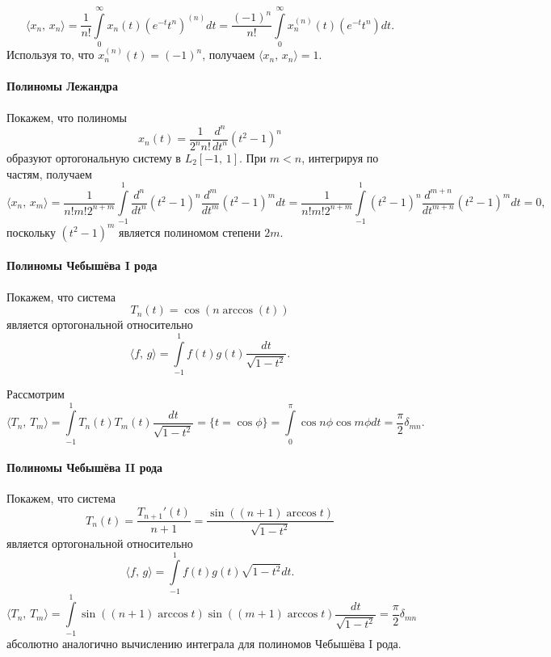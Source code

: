 \documentclass[16pt]{article}
\newcommand\Scal[2]{\langle #1,\, #2 \rangle}
\newcommand\Int[2]{\int\limits_{#1}^{#2}}
\begin{document}
$$\Scal{x_n}{x_n} = \frac{1}{n!}\Int{0}{\infty}x_n(t)(e^{-t}t^n)^{(n)}dt = \frac{(-1)^n}{n!}\Int{0}{\infty}x_n^{(n)}(t)(e^{-t}t^n)dt.$$
Используя то, что $x_n^{(n)}(t) = (-1)^n$, получаем $\Scal{x_n}{x_n} = 1$.

\paragraph{Полиномы Лежандра}
Покажем, что полиномы 
$$x_n(t) = \frac{1}{2^n n!}\frac{d^n}{dt^n}(t^2-1)^n$$
образуют ортогональную систему в $L_2[-1,\,1]$.
При $m < n$, интегрируя по частям, получаем 
$$\Scal{x_n}{x_m} = \frac{1}{n! m! 2^{n+m}}\Int{-1}{1}\frac{d^n}{dt^n}(t^2-1)^n\frac{d^m}{dt^m}(t^2-1)^mdt = 
\frac{1}{n!m!2^{n+m}}\Int{-1}{1}(t^2-1)^n\frac{d^{m+n}}{dt^{m+n}}(t^2-1)^mdt = 0,$$
поскольку $(t^2-1)^m$ является полиномом степени $2m$.

\paragraph{Полиномы Чебышёва I рода}
Покажем, что система
$$T_n(t) = \cos(n \arccos(t))$$
является ортогональной относительно 
$$\Scal{f}{g} = \Int{-1}{1}f(t)g(t)\frac{dt}{\sqrt{1-t^2}}.$$

Рассмотрим 
$$\Scal{T_n}{T_m} = \Int{-1}{1}T_n(t)T_m(t)\frac{dt}{\sqrt{1-t^2}} = \{t = \cos \phi\} = \Int{0}{\pi}\cos n\phi
\cos m\phi dt = \frac{\pi}{2}\delta_{mn}.$$

\paragraph{Полиномы Чебышёва II рода}
Покажем, что система
$$T_n(t) = \frac{T_{n+1}'(t)}{n+1} = \frac{\sin((n+1)\arccos t)}{\sqrt{1-t^2}}$$
является ортогональной относительно 
$$\Scal{f}{g} = \Int{-1}{1}f(t)g(t)\sqrt{1-t^2}dt.$$
$$\Scal{T_n}{T_m} = \Int{-1}{1}\sin((n+1)\arccos t)\sin((m+1)\arccos t)\frac{dt}{\sqrt{1-t^2}} = \frac{\pi}{2}\delta_{mn}$$
абсолютно аналогично вычислению интеграла для полиномов Чебышёва I рода.
\end{document}
